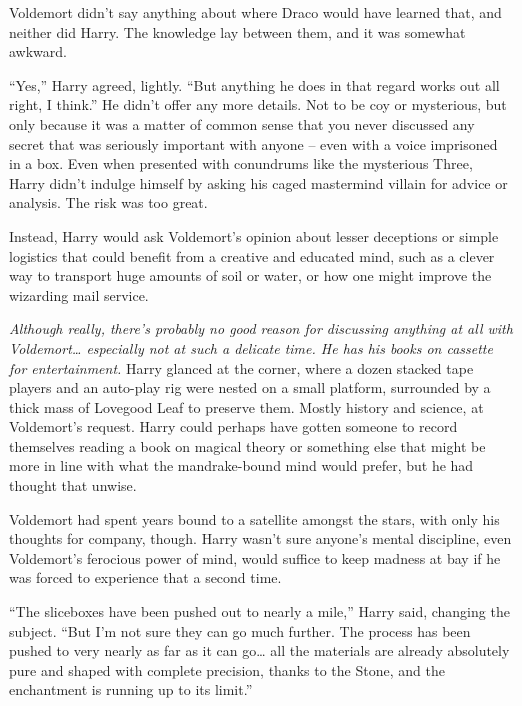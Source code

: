 Voldemort didn't say anything about where Draco would have learned that,
and neither did Harry. The knowledge lay between them, and it was
somewhat awkward.

``Yes,'' Harry agreed, lightly. ``But anything he does in that regard
works out all right, I think.'' He didn't offer any more details. Not to
be coy or mysterious, but only because it was a matter of common sense
that you never discussed any secret that was seriously important with
anyone -- even with a voice imprisoned in a box. Even when presented
with conundrums like the mysterious Three, Harry didn't indulge himself
by asking his caged mastermind villain for advice or analysis. The risk
was too great.

Instead, Harry would ask Voldemort's opinion about lesser deceptions or
simple logistics that could benefit from a creative and educated mind,
such as a clever way to transport huge amounts of soil or water, or how
one might improve the wizarding mail service.

\emph{Although really, there's probably no good reason for discussing
anything at all with Voldemort\ldots{} especially not at such a delicate
time. He has his books on cassette for entertainment.} Harry glanced at
the corner, where a dozen stacked tape players and an auto-play rig were
nested on a small platform, surrounded by a thick mass of Lovegood Leaf
to preserve them. Mostly history and science, at Voldemort's request.
Harry could perhaps have gotten someone to record themselves reading a
book on magical theory or something else that might be more in line with
what the mandrake-bound mind would prefer, but he had thought that
unwise.

Voldemort had spent years bound to a satellite amongst the stars, with
only his thoughts for company, though. Harry wasn't sure anyone's mental
discipline, even Voldemort's ferocious power of mind, would suffice to
keep madness at bay if he was forced to experience that a second time.

``The sliceboxes have been pushed out to nearly a mile,'' Harry said,
changing the subject. ``But I'm not sure they can go much further. The
process has been pushed to very nearly as far as it can go\ldots{} all
the materials are already absolutely pure and shaped with complete
precision, thanks to the Stone, and the enchantment is running up to its
limit.''

